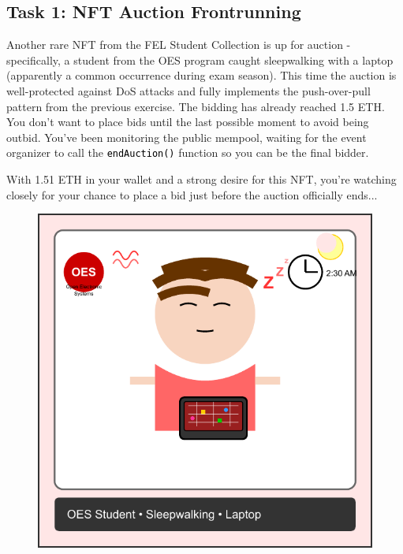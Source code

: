 \documentclass[12pt]{article}
\newcommand{\codegrey}[1]{%
  \texttt{\colorbox{black!4}{\textcolor{black}{#1}}}%
}
\begin{document}
\subsection*{Task 1: NFT Auction Frontrunning}
Another rare NFT from the FEL Student Collection is up for auction - specifically, a student from the OES program caught sleepwalking with a laptop (apparently a common occurrence during exam season). This time the auction is well-protected against DoS attacks and fully implements the push-over-pull pattern from the previous exercise. The bidding has already reached 1.5 ETH. You don't want to place bids until the last possible moment to avoid being outbid. You've been monitoring the public mempool, waiting for the event organizer to call the \codegrey{endAuction()} function so you can be the final bidder. 

With 1.51 ETH in your wallet and a strong desire for this NFT, you're watching closely for your chance to place a bid just before the auction officially ends...

\begin{figure}[H]
  \centering
  \begin{minipage}{0.3\textwidth}
    \includegraphics[width=\textwidth]{NFTs/oes-student-nft.pdf}
  \end{minipage}
\end{figure}
\end{document}
